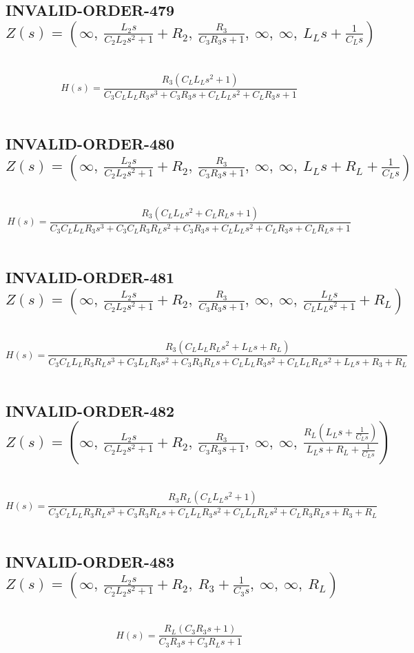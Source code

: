\documentclass{article}
\begin{document}
\subsection{INVALID-ORDER-479 $Z(s) = \left( \infty, \  \frac{L_{2} s}{C_{2} L_{2} s^{2} + 1} + R_{2}, \  \frac{R_{3}}{C_{3} R_{3} s + 1}, \  \infty, \  \infty, \  L_{L} s + \frac{1}{C_{L} s}\right)$ } \ 
\textbf{\[H(s) = \frac{R_{3} \left(C_{L} L_{L} s^{2} + 1\right)}{C_{3} C_{L} L_{L} R_{3} s^{3} + C_{3} R_{3} s + C_{L} L_{L} s^{2} + C_{L} R_{3} s + 1}\] } \ 
\subsection{INVALID-ORDER-480 $Z(s) = \left( \infty, \  \frac{L_{2} s}{C_{2} L_{2} s^{2} + 1} + R_{2}, \  \frac{R_{3}}{C_{3} R_{3} s + 1}, \  \infty, \  \infty, \  L_{L} s + R_{L} + \frac{1}{C_{L} s}\right)$ } \ 
\textbf{\[H(s) = \frac{R_{3} \left(C_{L} L_{L} s^{2} + C_{L} R_{L} s + 1\right)}{C_{3} C_{L} L_{L} R_{3} s^{3} + C_{3} C_{L} R_{3} R_{L} s^{2} + C_{3} R_{3} s + C_{L} L_{L} s^{2} + C_{L} R_{3} s + C_{L} R_{L} s + 1}\] } \ 
\subsection{INVALID-ORDER-481 $Z(s) = \left( \infty, \  \frac{L_{2} s}{C_{2} L_{2} s^{2} + 1} + R_{2}, \  \frac{R_{3}}{C_{3} R_{3} s + 1}, \  \infty, \  \infty, \  \frac{L_{L} s}{C_{L} L_{L} s^{2} + 1} + R_{L}\right)$ } \ 
\textbf{\[H(s) = \frac{R_{3} \left(C_{L} L_{L} R_{L} s^{2} + L_{L} s + R_{L}\right)}{C_{3} C_{L} L_{L} R_{3} R_{L} s^{3} + C_{3} L_{L} R_{3} s^{2} + C_{3} R_{3} R_{L} s + C_{L} L_{L} R_{3} s^{2} + C_{L} L_{L} R_{L} s^{2} + L_{L} s + R_{3} + R_{L}}\] } \ 
\subsection{INVALID-ORDER-482 $Z(s) = \left( \infty, \  \frac{L_{2} s}{C_{2} L_{2} s^{2} + 1} + R_{2}, \  \frac{R_{3}}{C_{3} R_{3} s + 1}, \  \infty, \  \infty, \  \frac{R_{L} \left(L_{L} s + \frac{1}{C_{L} s}\right)}{L_{L} s + R_{L} + \frac{1}{C_{L} s}}\right)$ } \ 
\textbf{\[H(s) = \frac{R_{3} R_{L} \left(C_{L} L_{L} s^{2} + 1\right)}{C_{3} C_{L} L_{L} R_{3} R_{L} s^{3} + C_{3} R_{3} R_{L} s + C_{L} L_{L} R_{3} s^{2} + C_{L} L_{L} R_{L} s^{2} + C_{L} R_{3} R_{L} s + R_{3} + R_{L}}\] } \ 
\subsection{INVALID-ORDER-483 $Z(s) = \left( \infty, \  \frac{L_{2} s}{C_{2} L_{2} s^{2} + 1} + R_{2}, \  R_{3} + \frac{1}{C_{3} s}, \  \infty, \  \infty, \  R_{L}\right)$ } \ 
\textbf{\[H(s) = \frac{R_{L} \left(C_{3} R_{3} s + 1\right)}{C_{3} R_{3} s + C_{3} R_{L} s + 1}\] } \ 
\end{document}
